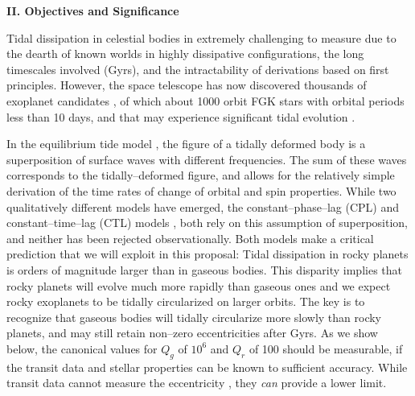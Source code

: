 \bigskip
\centerline{\bf II. Objectives and Significance}
\smallskip

\medskip
{\centerline{}}
\smallskip

Tidal dissipation in celestial bodies in extremely challenging to
measure
\citep{GoldreichSoter66,Hut81,AksnesFranklin01,Jackson08,Jackson09,Lainey12}
due to the dearth of known worlds in highly dissipative
configurations, the long timescales involved (Gyrs), and the
intractability of derivations based on first principles.  However,
the \kepler space telescope has now discovered thousands of exoplanet
candidates
\citep{2013ApJS..204...24B}, of which about 1000 orbit FGK stars with
orbital periods less than 10 days, and that may experience significant
tidal evolution \citep{Rasio96,Jackson08,Matsumura10}.

In the equilibrium tide model
\citep{Darwin1880,MacDonald64,GoldreichSoter66,Hut81,FerrazMello08,Leconte10},
the figure of a tidally deformed body is a superposition of surface
waves with different frequencies.  The sum of these waves corresponds
to the tidally--deformed figure, and allows for the relatively simple
derivation of the time rates of change of orbital and spin properties.
While two qualitatively different models have emerged, the
constant--phase--lag (CPL) and constant--time--lag (CTL) models
\citep{Greenberg09}, both rely on this assumption of superposition,
and neither has been rejected observationally.  Both models make a
critical prediction that we will exploit in this proposal: Tidal
dissipation in rocky planets is orders of magnitude larger than in
gaseous bodies.  This disparity implies that rocky planets will evolve
much more rapidly than gaseous ones and we expect rocky exoplanets to
be tidally circularized on larger orbits.  The key is to recognize
that gaseous bodies will tidally circularize more slowly than rocky
planets, and may still retain non--zero eccentricities after Gyrs.
%
As we show below, the canonical values for $Q_g$ of $10^6$ and $Q_r$
of 100 should be measurable, if the transit data and stellar
properties can be known to sufficient accuracy.  While transit data
cannot measure the
eccentricity \citep{Barnes07,Burke08,2008ApJ...678.1407F}, they {\it
can} provide a lower limit.

\medskip
{\centerline{}}
\smallskip

